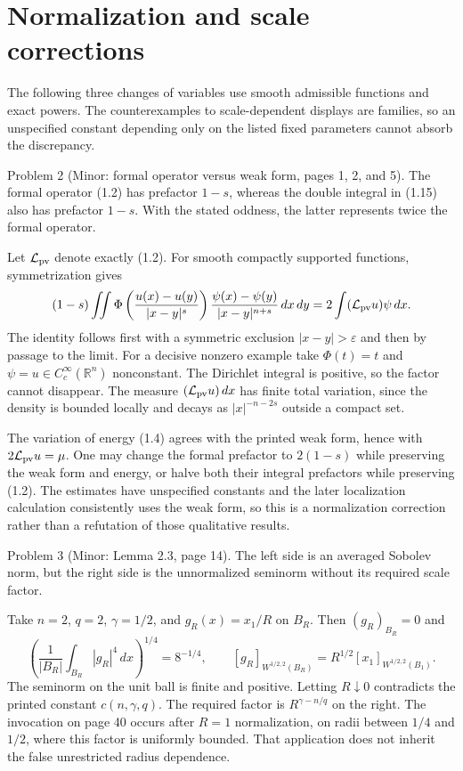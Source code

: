 \documentclass[10pt]{article}
\begin{document}
\section*{Normalization and scale corrections}
The following three changes of variables use smooth admissible functions and exact powers. The counterexamples to scale-dependent displays are families, so an unspecified constant depending only on the listed fixed parameters cannot absorb the discrepancy.\par
Problem 2 (Minor: formal operator versus weak form, pages 1, 2, and 5).  The formal operator (1.2) has prefactor \(1-s\), whereas the double integral in (1.15) also has prefactor \(1-s\). With the stated oddness, the latter represents twice the formal operator.\par
Let \(\mathcal L_{\rm pv}\) denote exactly (1.2). For smooth compactly supported functions, symmetrization gives \[(1-s)\iint
 \Phi\left(\frac{u(x)-u(y)}{|x-y|^s}\right)
 \frac{\psi(x)-\psi(y)}{|x-y|^{n+s}}\,dx\,dy
 =2\int(\mathcal L_{\rm pv}u)\psi\,dx.\] The identity follows first with a symmetric exclusion \(|x-y|>\varepsilon\) and then by passage to the limit. For a decisive nonzero example take \(\Phi(t)=t\) and \(\psi=u\in C_c^\infty(\mathbb R^n)\) nonconstant. The Dirichlet integral is positive, so the factor cannot disappear. The measure \((\mathcal L_{\rm pv}u)\,dx\) has finite total variation, since the density is bounded locally and decays as \(|x|^{-n-2s}\) outside a compact set.\par
The variation of energy (1.4) agrees with the printed weak form, hence with \(2\mathcal L_{\rm pv}u=\mu\). One may change the formal prefactor to \(2(1-s)\) while preserving the weak form and energy, or halve both their integral prefactors while preserving (1.2). The estimates have unspecified constants and the later localization calculation consistently uses the weak form, so this is a normalization correction rather than a refutation of those qualitative results.\par
Problem 3 (Minor: Lemma 2.3, page 14).  The left side is an averaged Sobolev norm, but the right side is the unnormalized seminorm without its required scale factor.\par
Take \(n=2\), \(q=2\), \(\gamma=1/2\), and \(g_R(x)=x_1/R\) on \(B_R\). Then \((g_R)_{B_R}=0\) and \[\left(\frac{1}{|B_R|}\int_{B_R}|g_R|^4\,dx\right)^{1/4}=8^{-1/4},\qquad
 [g_R]_{W^{1/2,2}(B_R)}
   =R^{1/2}[x_1]_{W^{1/2,2}(B_1)}.\] The seminorm on the unit ball is finite and positive. Letting \(R\downarrow0\) contradicts the printed constant \(c(n,\gamma,q)\). The required factor is \(R^{\gamma-n/q}\) on the right. The invocation on page 40 occurs after \(R=1\) normalization, on radii between \(1/4\) and \(1/2\), where this factor is uniformly bounded. That application does not inherit the false unrestricted radius dependence.\par
\end{document}

